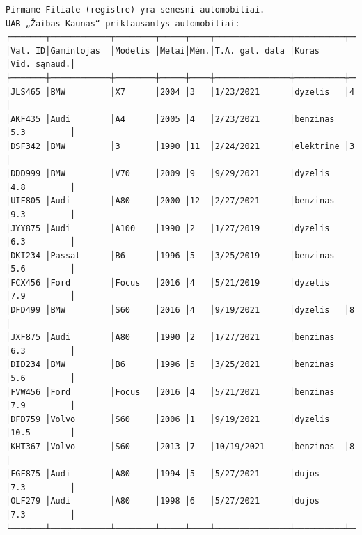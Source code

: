 \documentclass{article}
\begin{document}
\footnotesize
\begin{verbatim}
Pirmame Filiale (registre) yra senesni automobiliai.
UAB „Žaibas Kaunas“ priklausantys automobiliai:
┌───────┬────────────┬────────┬─────┬────┬───────────────┬──────────┬────────────┐
│Val. ID│Gamintojas  │Modelis │Metai│Mėn.│T.A. gal. data │Kuras     │Vid. sąnaud.│
├───────┼────────────┼────────┼─────┼────┼───────────────┼──────────┼────────────┤
│JLS465 │BMW         │X7      │2004 │3   │1/23/2021      │dyzelis   │4           │
│AKF435 │Audi        │A4      │2005 │4   │2/23/2021      │benzinas  │5.3         │
│DSF342 │BMW         │3       │1990 │11  │2/24/2021      │elektrine │3           │
│DDD999 │BMW         │V70     │2009 │9   │9/29/2021      │dyzelis   │4.8         │
│UIF805 │Audi        │A80     │2000 │12  │2/27/2021      │benzinas  │9.3         │
│JYY875 │Audi        │A100    │1990 │2   │1/27/2019      │dyzelis   │6.3         │
│DKI234 │Passat      │B6      │1996 │5   │3/25/2019      │benzinas  │5.6         │
│FCX456 │Ford        │Focus   │2016 │4   │5/21/2019      │dyzelis   │7.9         │
│DFD499 │BMW         │S60     │2016 │4   │9/19/2021      │dyzelis   │8           │
│JXF875 │Audi        │A80     │1990 │2   │1/27/2021      │benzinas  │6.3         │
│DID234 │BMW         │B6      │1996 │5   │3/25/2021      │benzinas  │5.6         │
│FVW456 │Ford        │Focus   │2016 │4   │5/21/2021      │benzinas  │7.9         │
│DFD759 │Volvo       │S60     │2006 │1   │9/19/2021      │dyzelis   │10.5        │
│KHT367 │Volvo       │S60     │2013 │7   │10/19/2021     │benzinas  │8           │
│FGF875 │Audi        │A80     │1994 │5   │5/27/2021      │dujos     │7.3         │
│OLF279 │Audi        │A80     │1998 │6   │5/27/2021      │dujos     │7.3         │
└───────┴────────────┴────────┴─────┴────┴───────────────┴──────────┴────────────┘


\end{verbatim}
\end{document}
